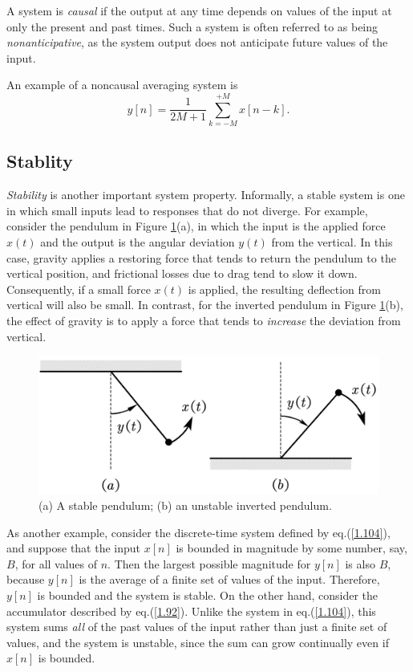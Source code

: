\documentclass[a4paper,twoside]{book}
\begin{document}
A system is \textit{causal} if the output at any time depends on values of the input at only the present and past times. Such a system is often referred to as being \textit{nonanticipative}, as the system output does not anticipate future values of the input.

An example of a noncausal averaging system is
\begin{equation}
    y[n] = \frac{1}{2M+1} \sum_{k = -M}^{+M}x[n-k].
    \label{1.104}
\end{equation}

\subsection{Stablity}
\label{section:1.6.4}

\textit{Stability} is another important system property. Informally, a stable system is one in which small inputs lead to responses that do not diverge. For example, consider the pendulum in Figure \ref{Fig4}(a), in which the input is the applied force $x(t)$ and the output is the angular deviation $y(t)$ from the vertical. In this case, gravity applies a restoring force that tends to return the pendulum to the vertical position, and frictional losses due to drag tend to slow it down. Consequently, if a small force $x(t)$ is applied, the resulting deflection from vertical will also be small. In contrast, for the inverted pendulum in Figure \ref{Fig4}(b), the effect of gravity is to apply a force that tends to \textit{increase} the deviation from vertical.

\begin{figure}[htbp]
    \centering
    \includegraphics[width=0.35\linewidth]{Fig4.png}
    \caption{(a) A stable pendulum; (b) an unstable inverted pendulum.}
    \label{Fig4}
\end{figure}

As another example, consider the discrete-time system defined by eq.\;(\ref{1.104}), and suppose that the input $x[n]$ is bounded in magnitude by some number, say, $B$, for all values of $n$. Then the largest possible magnitude for $y[n]$ is also $B$, because $y[n]$ is the average of a finite set of values of the input. Therefore, $y[n]$ is bounded and the system is stable. On the other hand, consider the accumulator described by eq.\;(\ref{1.92}). Unlike the system in eq.\;(\ref{1.104}), this system sums \textit{all} of the past values of the input rather than just a finite set of values, and the system is unstable, since the sum can grow continually even if $x[n]$ is bounded.
\end{document}
